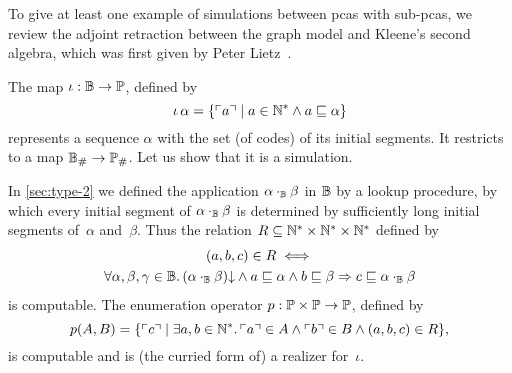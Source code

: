 %
%

To give at least one example of simulations between pcas with sub-pcas, we review the adjoint retraction between the graph model and Kleene's second algebra, which was first given by Peter Lietz~\cite{Lietz:04}.

The map $\iota: \mathbb{B} \to \mathbb{P}$, defined by
\begin{equation*}
  \iota \, \alpha =
  \{ \ulcorner a \urcorner \mid
    a \in \mathbb{N}^{*} \land a \sqsubseteq \alpha
    \}
\end{equation*}
%
represents a sequence $\alpha$ with the set (of codes) of its initial segments. It restricts to a map $\mathbb{B}_{\#} \to \mathbb{P}_{\#}$. Let us show that it is a simulation.

In \cref{sec:type-2}  we defined the application $\alpha \cdot_{\mathbb{B}} \beta$ in $\mathbb{B}$ by a lookup procedure, by which every initial segment of $\alpha \cdot_{\mathbb{B}} \beta$ is determined by sufficiently long initial segments of~$\alpha$ and~$\beta$. Thus the relation $R \subseteq \mathbb{N}^{*} \times \mathbb{N}^{*} \times \mathbb{N}^{*}$ defined by
%
\begin{multline*}
  (a, b, c) \in R \iff \\
  \forall \alpha, \beta, \gamma \in \mathbb{B} .\,
  (\alpha \cdot_{\mathbb{B}} \beta){\downarrow} \land
  a \sqsubseteq \alpha \land
  b \sqsubseteq \beta
  \Rightarrow
  c \sqsubseteq \alpha \cdot_{\mathbb{B}} \beta
\end{multline*}
%
is computable. The enumeration operator $p : \mathbb{P} \times \mathbb{P} \to \mathbb{P}$, defined by
% 
\begin{equation*}
  p (A, B) =
  \{ \ulcorner c \urcorner \mid
        \exists a, b \in \mathbb{N}^{*} .\,
          \ulcorner a \urcorner \in A \land \ulcorner b \urcorner \in B \land (a, b, c) \in R \},
\end{equation*}
% 
is computable and is (the curried form of) a realizer for~$\iota$.

